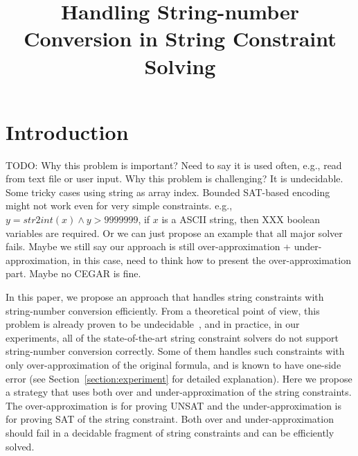 \documentclass{llncs}
\title{Handling String-number Conversion in String Constraint Solving}
\author{}
\institute{}
\begin{document}
\newcommand{\hide}[1]{}

\newcommand{\todo}[1]{{\color{blue}TODO: #1}}
\newcommand{\sti}[1]{\mbox{\textbf{toInt}($#1$)}}
\newcommand{\its}[1]{\mbox{\textbf{toStr}($#1$)}}
\newcommand{\varn}{\mbox{$\mathbb{V}_n$}}
\newcommand{\vars}{\mbox{$\mathbb{V}_s$}}
\newcommand{\cvar}{\mbox{$\mathbb{C}$}}
\newcommand{\modelof}[1]{[\![#1]\!]}
\newcommand{\true}{\mbox{$\mathsf{true}$}}
\newcommand{\false}{\mbox{$\mathsf{false}$}}



\maketitle


\section{Introduction} \label{section:introduction}

\todo{Why this problem is important? Need to say it is used often, e.g., read 
from text file or user input. Why this problem is challenging? It is undecidable. Some tricky cases 
using string as array index. Bounded SAT-based encoding might not work even for 
very simple constraints. e.g., $y=str2int(x) \wedge y>9999999$, if $x$ is a 
ASCII string, then XXX boolean variables are required. Or we can just propose 
an example that all major solver fails. Maybe we still say our approach is still over-approximation + under-approximation, in this case, need to think how to present the over-approximation part. Maybe no CEGAR is fine.}


In this paper, we propose an approach that handles string constraints with string-number conversion efficiently. From a theoretical point of view, this problem is already proven to be undecidable~\cite{vijay_rp}, and in practice, in our experiments, all of the state-of-the-art string constraint solvers do not support string-number conversion correctly. Some of them handles such constraints with only over-approximation of the original formula, and is known to have one-side error (see Section~\ref{section:experiment} for detailed explanation). Here we propose a strategy that uses both over and under-approximation of the string constraints. The over-approximation is for proving UNSAT and the under-approximation is for proving SAT of the string constraint. Both over and under-approximation should fail in a decidable fragment of string constraints and can be efficiently solved. 
\end{document}
